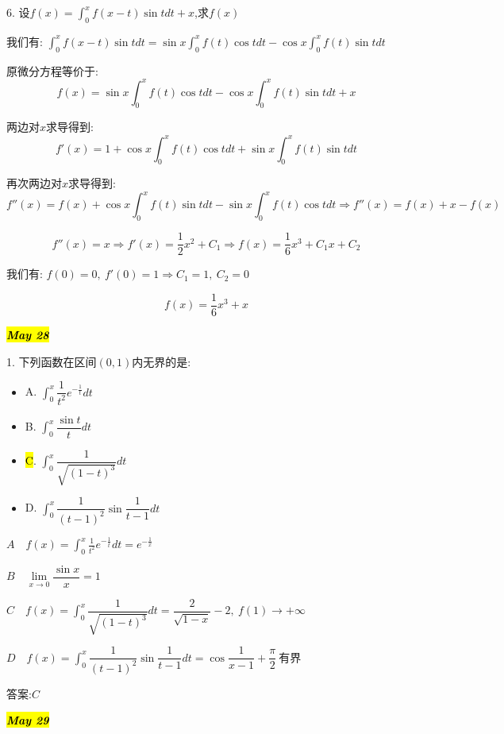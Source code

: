 6. 设$f(x)=\int_{0}^{x}f(x-t)\sin tdt+x$,求$f(x)$
\begin{solution}
	
	我们有: $\int_{0}^{x}f(x-t)\sin tdt=\sin x\int_{0}^{x}f(t)\cos tdt-\cos x\int_{0}^{x}f(t)\sin tdt$
	
	原微分方程等价于: 
	$$f(x)=\sin x\int_{0}^{x}f(t)\cos tdt-\cos x\int_{0}^{x}f(t)\sin tdt+x$$
	
	两边对$x$求导得到: 
	$$f'(x)=1+\cos x\int_{0}^{x}f(t)\cos tdt+\sin x\int_{0}^{x}f(t)\sin tdt$$
	
	再次两边对$x$求导得到: 
	$$f''(x)=f(x)+\cos x\int_{0}^{x}f(t)\sin tdt-\sin x\int_{0}^{x}f(t)\cos tdt\Rightarrow f''(x)=f(x)+x-f(x)$$
	
	$$f''(x)=x\Rightarrow f'(x)=\frac{1}{2}x^2+C_{1}\Rightarrow f(x)=\frac{1}{6}x^3+C_{1}x+C_{2}$$
	
	我们有: $f(0)=0,\ f'(0)=1\Rightarrow C_{1}=1,\ C_{2}=0$
	
	$$f(x)=\frac{1}{6}x^3+x$$
\end{solution}


\hl{\textbf{\textit{May 28}}}

1. 下列函数在区间$(0,1)$内无界的是: 
\begin{itemize}
	\item A. $\int_{0}^{x}\dfrac{1}{t^2}e^{-\frac{1}{t}}dt$ 
	\item B. $\int_{0}^{x}\dfrac{\sin t}{t}dt$ 
	\item \hl{C}. $\int_{0}^{x}\dfrac{1}{\sqrt{(1-t)^3}}dt$ 
	\item D. $\int_{0}^{x}\dfrac{1}{(t-1)^2}\sin\dfrac{1}{t-1}dt$ 
\end{itemize}
\begin{solution}
	
	$A \quad f(x)=\int_{0}^{x}\frac{1}{t^2}e^{-\frac{1}{t}}dt=e^{-\frac{1}{x}}$
	
	$B \quad \lim\limits_{x\rightarrow 0}\dfrac{\sin x}{x}=1$
	
	$C \quad f(x)=\int_{0}^{x}\dfrac{1}{\sqrt{(1-t)^3}}dt=\dfrac{2}{\sqrt{1-x}}-2, \ f(1)\rightarrow+\infty$
	
	$D \quad f(x)=\int_{0}^{x}\dfrac{1}{(t-1)^2}\sin\dfrac{1}{t-1}dt=\cos \dfrac{1}{x-1}+\dfrac{\pi}{2}\  \text{有界}$
	
	答案:$C$
\end{solution}


\hl{\textbf{\textit{May 29}}}

